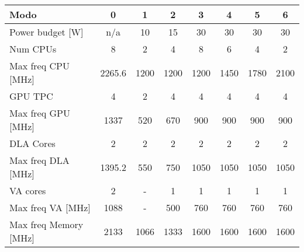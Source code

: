 


\begin{table}[]

\centering
\begin{tabular}{lccccccc}
\toprule
Modo                      & 0 & 1 & 2 & 3 & 4 & 5 & 6 \\ \midrule
Power budget {[}W{]}      & n/a        & 10         & 15         & 30         & 30         & 30         & 30         \\ 
Num CPUs                    & 8          & 2          & 4          & 8          & 6          & 4          & 2          \\ 
Max freq CPU {[}MHz{]}    & 2265.6     & 1200       & 1200       & 1200       & 1450       & 1780       & 2100       \\ 
GPU TPC                   & 4          & 2          & 4          & 4          & 4          & 4          & 4          \\ 
Max freq GPU {[}MHz{]}    & 1337       & 520        & 670        & 900        & 900        & 900        & 900        \\ 
DLA Cores                 & 2          & 2          & 2          & 2          & 2          & 2          & 2          \\ 
Max freq DLA {[}MHz{]}    & 1395.2     & 550        & 750        & 1050       & 1050       & 1050       & 1050       \\ 
VA cores                  & 2          & -          & 1          & 1          & 1          & 1          & 1          \\ 
Max freq VA {[}MHz{]}     & 1088       & -          & 500        & 760        & 760        & 760        & 760        \\ 
Max freq Memory {[}MHz{]} & 2133       & 1066       & 1333       & 1600       & 1600       & 1600       & 1600       \\ 
\bottomrule
\end{tabular}

\end{table}